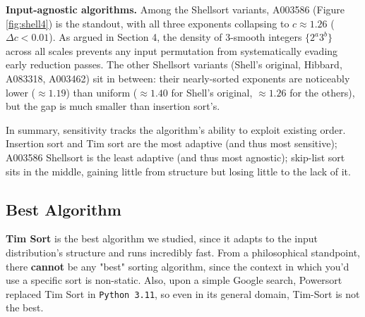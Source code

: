 \textbf{Input-agnostic algorithms.} Among the Shellsort variants, A003586 (Figure \ref{fig:shell4}) is the standout, with all three exponents collapsing to $c \approx 1.26$ ($\Delta c < 0.01$). As argued in Section 4, the density of 3-smooth integers $\{2^a 3^b\}$ across all scales prevents any input permutation from systematically evading early reduction passes. The other Shellsort variants (Shell's original, Hibbard, A083318, A003462) sit in between: their nearly-sorted exponents are noticeably lower ($\approx 1.19$) than uniform ($\approx 1.40$ for Shell's original, $\approx 1.26$ for the others), but the gap is much smaller than insertion sort's.

In summary, sensitivity tracks the algorithm's ability to exploit existing order. Insertion sort and Tim sort are the most adaptive (and thus most sensitive); A003586 Shellsort is the least adaptive (and thus most agnostic); skip-list sort sits in the middle, gaining little from structure but losing little to the lack of it.

\subsection{Best Algorithm}
\textbf{Tim Sort} is the best algorithm we studied, since it adapts to the input distribution's structure and runs incredibly fast. From a philosophical standpoint, there \textbf{cannot} be any "best" sorting algorithm, since the context in which you'd use a specific sort is non-static. Also, upon a simple Google search, Powersort replaced Tim Sort in \texttt{Python 3.11}, so even in its general domain, Tim-Sort is not the best.

